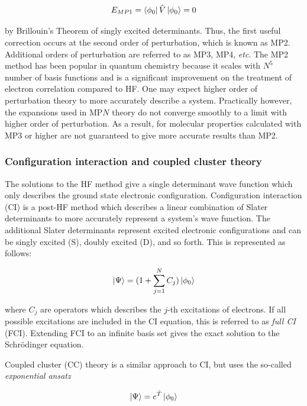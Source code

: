 \begin{equation}
  E_{MP1} = \bra{\phi_0}\hat{V}\ket{\phi_0} = 0
\end{equation}

\noindent by Brillouin's Theorem of singly excited determinants. Thus, the first useful correction occurs at the second order of perturbation, which is known as MP2. Additional orders of perturbation are referred to as MP3, MP4, \emph{etc}. The MP2 method has been popular in quantum chemistry because it scales with $N^5$ number of basis functions and is a significant improvement on the treatment of electron correlation compared to HF. One may expect higher order of perturbation theory to more accurately describe a system. Practically however, the expansions used in MP$N$ theory do not converge smoothly to a limit with higher order of perturbation.\cite{Leininger2000} As a result, for molecular properties calculated with MP3 or higher are not guaranteed to give more accurate results than MP2.

\subsubsection{Configuration interaction and coupled cluster theory}

The solutions to the HF method give a single determinant wave function which only describes the ground state electronic configuration. Configuration interaction (CI) is a post-HF method which describes a linear combination of Slater determinants to more accurately represent a system's wave function. The additional Slater determinants represent excited electronic configurations and can be singly excited (S), doubly excited (D), and so forth. This is represented as follows:

\begin{equation}
  \ket{\Psi} = (1+\sum_{j=1}^N C_j) \ket{\phi_0}
\end{equation}

\noindent where $C_j$ are operators which describes the $j$-th excitations of electrons. If all possible excitations are included in the CI equation, this is referred to as \emph{full CI} (FCI). Extending FCI to an infinite basis set gives the exact solution to the Schr{\"o}dinger equation.

Coupled cluster (CC) theory\cite{Crawford2000} is a similar approach to CI, but uses the so-called \emph{exponential ansatz}

\begin{equation}
  \ket{\Psi} = e^{\hat{T}}\ket{\phi_0}
\end{equation}

